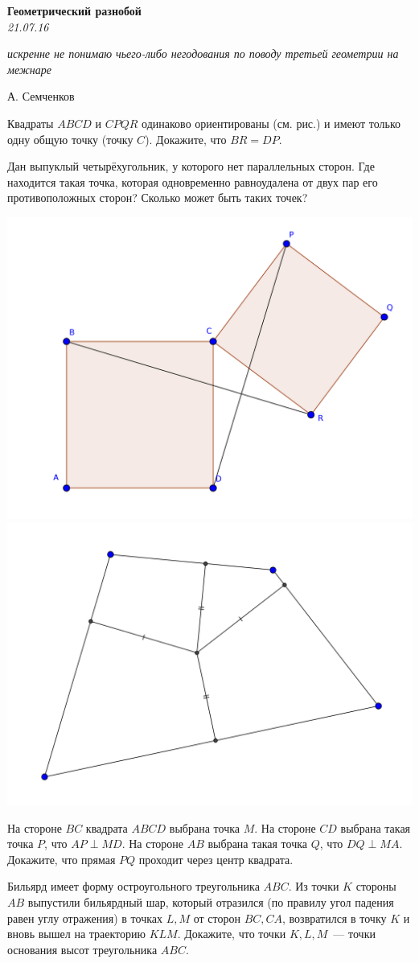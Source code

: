 \begin{center}
\textbf{\Large Геометрический разнобой}\\
\textit{21.07.16}
\end{center}

\renewcommand{\epigraphwidth}{.55\textheight}
\epigraph{\it искренне не понимаю чьего-либо негодования по поводу третьей геометрии на межнаре}{А. Семченков}

\begin{problems}
\item Квадраты $ABCD$ и $CPQR$ одинаково ориентированы (см. рис.) и имеют только одну общую точку (точку $C$). Докажите, что $BR=DP$.

\item Дан выпуклый четырёхугольник, у которого нет параллельных сторон. Где находится такая точка, которая одновременно равноудалена от двух пар его противоположных сторон? Сколько может быть таких точек?

\begin{center}
	\includegraphics[width=.45\textwidth]{georazn01}
	\includegraphics[width=.45\textwidth]{georazn02}
\end{center}

\item На стороне $BC$ квадрата $ABCD$ выбрана точка $M$. На стороне $CD$ выбрана такая точка $P$, что $AP\perp MD$. На стороне $AB$ выбрана такая точка $Q$, что $DQ\perp MA$. Докажите, что прямая $PQ$ проходит через центр квадрата.

\item Бильярд имеет форму остроугольного треугольника $ABC$. Из точки $K$ стороны $AB$ выпустили бильярдный шар, который отразился (по правилу угол падения равен углу отражения) в точках $L, M$ от сторон $BC, CA$, возвратился в точку $K$ и вновь вышел на траекторию $KLM$. Докажите, что точки $K, L, M$~--- точки основания высот треугольника $ABC$.


\end{problems}
